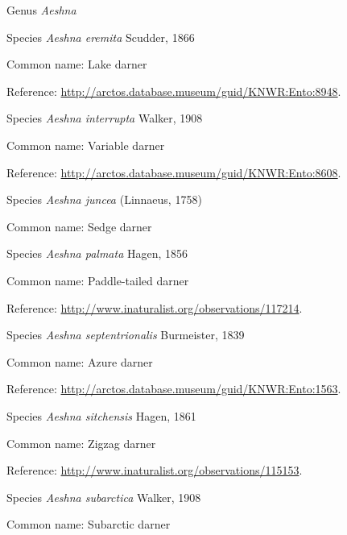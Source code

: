 \documentclass[9pt, article]{memoir}
\begin{document}
\begin{multicols}{2}
\vspace{6pt}\noindent\hspace{30pt}Genus \textit{Aeshna}


\vspace{6pt}\noindent\hspace{36pt}Species \textit{Aeshna eremita} Scudder, 1866


Common name: Lake darner

Reference: 
\url{http://arctos.database.museum/guid/KNWR:Ento:8948}.

\vspace{6pt}\noindent\hspace{36pt}Species \textit{Aeshna interrupta} Walker, 1908


Common name: Variable darner

Reference: 
\url{http://arctos.database.museum/guid/KNWR:Ento:8608}.

\vspace{6pt}\noindent\hspace{36pt}Species \textit{Aeshna juncea} (Linnaeus, 1758)


Common name: Sedge darner

\vspace{6pt}\noindent\hspace{36pt}Species \textit{Aeshna palmata} Hagen, 1856


Common name: Paddle-tailed darner

Reference: 
\url{http://www.inaturalist.org/observations/117214}.

\vspace{6pt}\noindent\hspace{36pt}Species \textit{Aeshna septentrionalis} Burmeister, 1839


Common name: Azure darner

Reference: 
\url{http://arctos.database.museum/guid/KNWR:Ento:1563}.

\vspace{6pt}\noindent\hspace{36pt}Species \textit{Aeshna sitchensis} Hagen, 1861


Common name: Zigzag darner

Reference: 
\url{http://www.inaturalist.org/observations/115153}.

\vspace{6pt}\noindent\hspace{36pt}Species \textit{Aeshna subarctica} Walker, 1908


Common name: Subarctic darner


\end{multicols}
\end{document}
